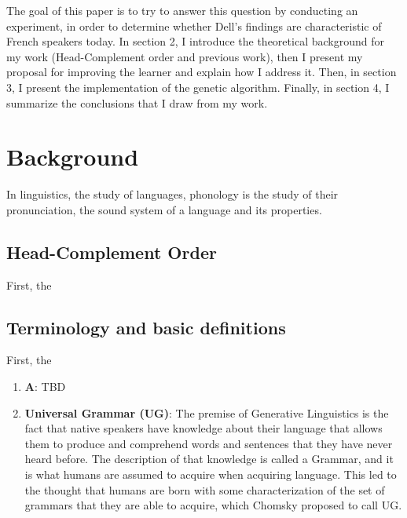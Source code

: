 \documentclass{article}
\begin{document}
The goal of this paper is to try to answer this question by conducting an experiment, in order to determine whether Dell's findings are characteristic of  French speakers today. 
In section 2, I introduce the theoretical background for my work (Head-Complement order and previous work),  then I present my proposal for improving the learner and explain how I address it. 
Then,  in section 3,  I present the implementation of the genetic algorithm. 
Finally,  in section 4,  I summarize the conclusions that I draw from my work.

\clearpage
\section{Background} 
In linguistics, the study of languages, phonology is the study of their pronunciation,  the sound system of a language and its properties.

\subsection{Head-Complement Order} %


First, the 

\subsection{Terminology and basic definitions} %
First, the 
\begin{enumerate}
  \item \textbf{A}: TBD
  \item \textbf{Universal Grammar (UG)}: The premise of Generative Linguistics is the fact that native speakers have knowledge about
their language that allows them to produce and comprehend words and sentences that they have never heard before. The description of that knowledge is called a Grammar, and it is what humans are assumed to acquire when acquiring language. This led to the thought that humans are born with some characterization of the set of grammars that they are able to acquire,  which Chomsky proposed to call UG.
\end{enumerate}
\end{document}
